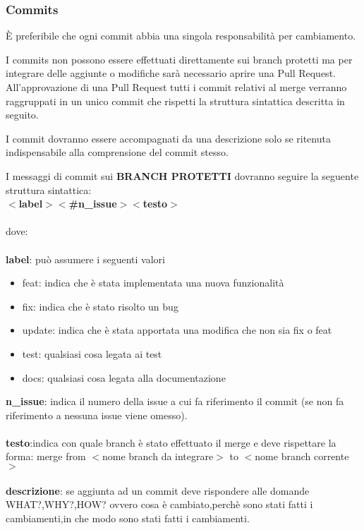 \subsubsection{Commits}
È preferibile che ogni commit abbia una singola responsabilità per cambiamento.

I commits non possono essere effettuati direttamente sui branch protetti ma per integrare delle aggiunte o modifiche sarà necessario aprire una Pull Request.
All'approvazione di una Pull Request tutti i commit relativi al merge verranno raggruppati in un unico commit che rispetti la struttura sintattica descritta in seguito.

I commit dovranno essere accompagnati da una descrizione solo se ritenuta indispensabile alla comprensione del commit stesso.

I messaggi di commit sui \textbf{\uppercase{branch protetti}} dovranno seguire la seguente struttura sintattica:\\

\textbf{$<$label$>$$<$\#n\_issue$>$$<$testo$>$}\\\\
dove:\\\\
\textbf{label}: può assumere i seguenti valori
\begin{itemize}
\item feat: indica che è stata implementata una nuova funzionalità
\item fix: indica che è stato risolto un bug
\item update: indica che è stata apportata una modifica che non sia fix o feat
\item test: qualsiasi cosa legata ai test
\item docs: qualsiasi cosa legata alla documentazione
\end{itemize}
\textbf{n\_issue}: indica il numero della issue a cui fa riferimento il commit (se non fa riferimento a nessuna issue viene omesso).\\\\
\textbf{testo}:indica con quale branch è stato effettuato il merge e deve rispettare la forma: merge from $<$nome branch da integrare$>$ to $<$nome branch corrente$>$ \\\\
\textbf{descrizione}: se aggiunta ad un commit deve rispondere alle domande WHAT?,WHY?,HOW? ovvero
cosa è cambiato,perchè sono stati fatti i cambiamenti,in che modo sono stati fatti i cambiamenti.\\

